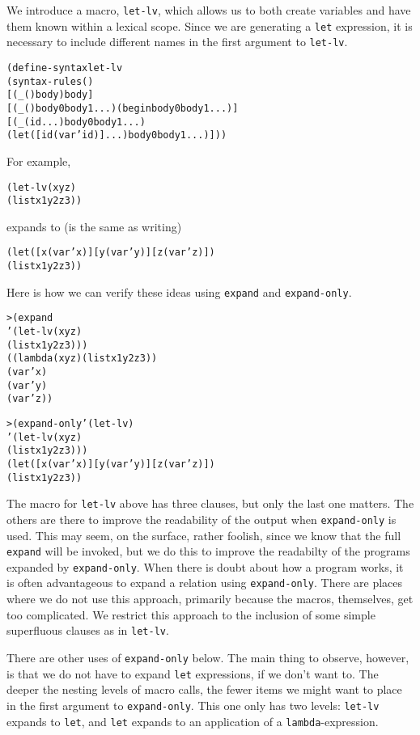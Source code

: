 We introduce a macro, \texttt{let-lv}, which allows us to both create
variables and have them known within a lexical scope.  Since
we are generating a \texttt{let} expression, it is necessary to
include different names in the first argument to \texttt{let-lv}.

\begin{alltt}
(define-syntax let-lv
  (syntax-rules ()
    [(_ () body) body]
    [(_ () body0 body1 ...) (begin body0 body1 ...)]
    [(_ (id ...) body0 body1 ...)
     (let ([id (var 'id)] ...) body0 body1 ...)]))
\end{alltt}

\noindent
For example,
\begin{alltt}
(let-lv (x y z)
  (list x 1 y 2 z 3))

\end{alltt}

\noindent
expands to (is the same as writing)

\begin{alltt}
(let ([x (var 'x)] [y (var 'y)] [z (var 'z)])
  (list x 1 y 2 z 3))
\end{alltt}

Here is how we can verify these ideas using \texttt{expand} and
\texttt{expand-only}.

\begin{alltt}
> (expand
    '(let-lv (x y z)
       (list x 1 y 2 z 3)))
((lambda (x y z) (list x 1 y 2 z 3))
 (var 'x)
 (var 'y)
 (var 'z))

> (expand-only '(let-lv)
    '(let-lv (x y z)
       (list x 1 y 2 z 3)))
(let ([x (var 'x)] [y (var 'y)] [z (var 'z)])
  (list x 1 y 2 z 3))
\end{alltt}

The macro for \texttt{let-lv} above has three clauses, but only the
last one matters.  The others are there to improve the readability
of the output when \texttt{expand-only} is used.  This may seem, on the
surface, rather foolish, since we know that the full \texttt{expand}
will be invoked, but we do this to improve the readabilty of the
programs expanded by \texttt{expand-only}.  When there is doubt about
how a program works, it is often advantageous to expand a relation
using \texttt{expand-only}.  There are places where we do not use
this approach, primarily because the macros, themselves, get too
complicated.  We restrict this approach to the inclusion of some
simple superfluous clauses as in \texttt{let-lv}.

There are other uses of \texttt{expand-only} below.  The main thing
to observe, however, is that we do not have to expand
\texttt{let} expressions, if we don't want to.  The deeper the nesting
levels of macro calls, the fewer items we might want to place in the
first argument to \texttt{expand-only}.  This one only has two levels:
\texttt{let-lv} expands to \texttt{let}, and \texttt{let} expands to an
application of a \texttt{lambda}-expression.

